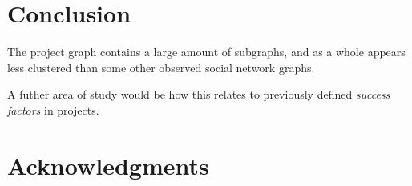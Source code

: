\documentclass{proc}
\begin{document}
\section{Conclusion}
The project graph contains a large amount of subgraphs, and as a whole appears less clustered than some other observed social network graphs\cite{madey2002open}.

A futher area of study would be how this relates to previously defined \textit{success factors} in projects\cite{cooke2002real}.


\section{Acknowledgments}






\end{document}
